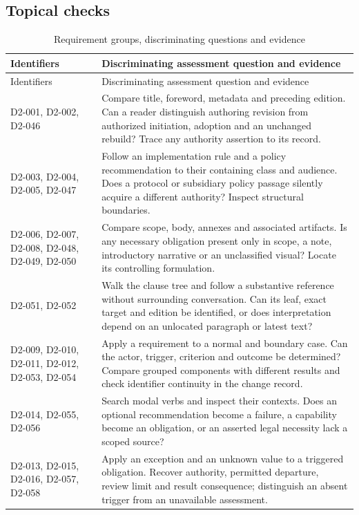 \documentclass[11pt,a4paper]{article}
\begin{document}
\subsection{Topical checks}
\begingroup\small
\begin{longtable}{L{0.26\textwidth}L{0.64\textwidth}}
\caption{Requirement groups, discriminating questions and evidence}\label{tab:d2-self-assessment}\\
\toprule Identifiers & Discriminating assessment question and evidence\\\midrule
\endfirsthead
\toprule Identifiers & Discriminating assessment question and evidence\\\midrule
\endhead
D2-001, D2-002, D2-046 & Compare title, foreword, metadata and preceding edition. Can a reader distinguish authoring revision from authorized initiation, adoption and an unchanged rebuild? Trace any authority assertion to its record.\\
D2-003, D2-004, D2-005, D2-047 & Follow an implementation rule and a policy recommendation to their containing class and audience. Does a protocol or subsidiary policy passage silently acquire a different authority? Inspect structural boundaries.\\
D2-006, D2-007, D2-008, D2-048, D2-049, D2-050 & Compare scope, body, annexes and associated artifacts. Is any necessary obligation present only in scope, a note, introductory narrative or an unclassified visual? Locate its controlling formulation.\\
D2-051, D2-052 & Walk the clause tree and follow a substantive reference without surrounding conversation. Can its leaf, exact target and edition be identified, or does interpretation depend on an unlocated paragraph or latest text?\\
D2-009, D2-010, D2-011, D2-012, D2-053, D2-054 & Apply a requirement to a normal and boundary case. Can the actor, trigger, criterion and outcome be determined? Compare grouped components with different results and check identifier continuity in the change record.\\
D2-014, D2-055, D2-056 & Search modal verbs and inspect their contexts. Does an optional recommendation become a failure, a capability become an obligation, or an asserted legal necessity lack a scoped source?\\
D2-013, D2-015, D2-016, D2-057, D2-058 & Apply an exception and an unknown value to a triggered obligation. Recover authority, permitted departure, review limit and result consequence; distinguish an absent trigger from an unavailable assessment.\\

\end{longtable}
\end{document}
